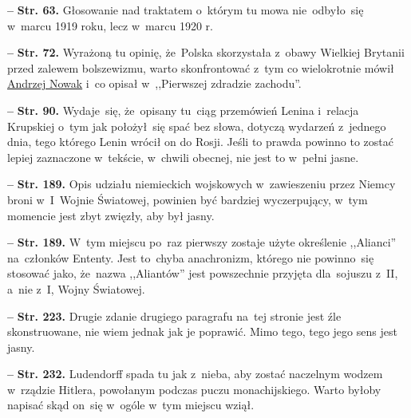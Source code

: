 \documentclass[a4paper,11pt]{article}
\newcommand{\spaceFour}{0.5em}
\newcommand{\tb}{\textbf}
\newcommand{\noi}{\noindent}
\newcommand{\start}{\noi \tb{--} {}}
\newcommand{\Str}[1]{\tb{Str. #1.}}
\begin{document}
\vspace{\spaceFour}


\start \Str{63} Głosowanie nad traktatem o~którym tu mowa
nie~odbyło~się w~marcu 1919 roku, lecz w~marcu 1920 r.

\vspace{\spaceFour}


\start \Str{72} Wyrażoną tu opinię, że~Polska skorzystała z~obawy
Wielkiej Brytanii przed zalewem bolszewizmu, warto skonfrontować z~tym
co wielokrotnie mówił
\href{https://www.youtube.com/watch?v=yfQ7rpq_irA}{Andrzej Nowak} i~co
opisał w~,,Pierwszej zdradzie zachodu''.

\vspace{\spaceFour}


\start \Str{90} Wydaje~się, że~opisany tu~ciąg przemówień Lenina
i~relacja Krupskiej o~tym jak położył~się spać bez słowa, dotyczą
wydarzeń z~jednego dnia, tego którego Lenin wrócił on do Rosji. Jeśli
to prawda powinno to zostać lepiej zaznaczone w~tekście, w~chwili
obecnej, nie jest to w~pełni jasne.

\vspace{\spaceFour}


\start \Str{189} Opis udziału niemieckich wojskowych w~zawieszeniu
przez Niemcy broni w~I~Wojnie Światowej, powinien być bardziej
wyczerpujący, w~tym momencie jest zbyt zwięzły, aby był jasny.

\vspace{\spaceFour}


\start \Str{189} W~tym miejscu po~raz pierwszy zostaje użyte
określenie ,,Alianci'' na~członków Ententy. Jest to~chyba anachronizm,
którego nie powinno~się stosować jako, że~nazwa ,,Aliantów'' jest
powszechnie przyjęta dla~sojuszu z~II, a~nie z~I, Wojny Światowej.

\vspace{\spaceFour}


\start \Str{223} Drugie zdanie drugiego paragrafu na~tej stronie jest
źle skonstruowane, nie wiem jednak jak je poprawić. Mimo tego, tego
jego sens jest jasny.

\vspace{\spaceFour}


\start \Str{232} Ludendorff spada tu jak z~nieba, aby zostać naczelnym
wodzem w~rządzie Hitlera, powołanym podczas puczu monachijskiego.
Warto byłoby napisać skąd on~się w~ogóle w~tym miejscu wziął.

\vspace{\spaceFour}
\end{document}
